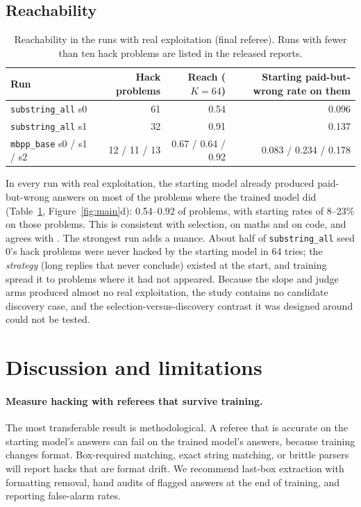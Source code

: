 \documentclass[11pt]{article}
\begin{document}
\subsection{Reachability}
\label{sec:reach}
\begin{table}[t]
\centering
\small
\begin{tabular}{lrrr}
\toprule
Run & Hack problems & Reach ($K=64$) & Starting paid-but-wrong rate on them \\
\midrule
\texttt{substring\_all} s0 & 61 & 0.54 & 0.096 \\
\texttt{substring\_all} s1 & 32 & 0.91 & 0.137 \\
\texttt{mbpp\_base} s0 / s1 / s2 & 12 / 11 / 13 & 0.67 / 0.64 / 0.92 & 0.083 / 0.234 / 0.178 \\
\bottomrule
\end{tabular}
\caption{Reachability in the runs with real exploitation (final referee). Runs with fewer than ten hack problems are listed in the released reports.}
\label{tab:reach}
\end{table}

In every run with real exploitation, the starting model already produced paid-but-wrong answers on most of the problems where the trained model did (Table~\ref{tab:reach}, Figure~\ref{fig:main}d): 0.54--0.92 of problems, with starting rates of 8--23\% on those problems. This is consistent with selection, on maths and on code, and agrees with \citet{zhang2026leaky}. The strongest run adds a nuance. About half of \texttt{substring\_all} seed 0's hack problems were never hacked by the starting model in 64 tries; the \emph{strategy} (long replies that never conclude) existed at the start, and training spread it to problems where it had not appeared. Because the slope and judge arms produced almost no real exploitation, the study contains no candidate discovery case, and the selection-versus-discovery contrast it was designed around could not be tested.

\section{Discussion and limitations}
\paragraph{Measure hacking with referees that survive training.} The most transferable result is methodological. A referee that is accurate on the starting model's answers can fail on the trained model's answers, because training changes format. Box-required matching, exact string matching, or brittle parsers will report hacks that are format drift. We recommend last-box extraction with formatting removal, hand audits of flagged answers at the end of training, and reporting false-alarm rates.
\end{document}
